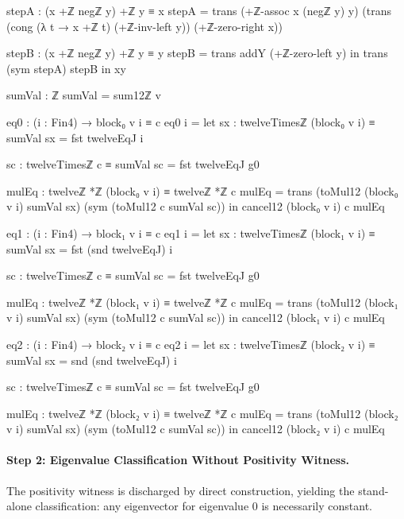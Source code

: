 \documentclass[11pt,a4paper]{book}
\begin{document}
\begin{code}
            stepA : (x +ℤ negℤ y) +ℤ y ≡ x
            stepA =
              trans
                (+ℤ-assoc x (negℤ y) y)
                (trans
                  (cong (λ t → x +ℤ t) (+ℤ-inv-left y))
                  (+ℤ-zero-right x))

            stepB : (x +ℤ negℤ y) +ℤ y ≡ y
            stepB = trans addY (+ℤ-zero-left y)
          in
          trans (sym stepA) stepB
      in
      xy

    sumVal : ℤ
    sumVal = sum12ℤ v

    eq0 : (i : Fin4) → block₀ v i ≡ c
    eq0 i =
      let
        sx : twelveTimesℤ (block₀ v i) ≡ sumVal
        sx = fst twelveEqJ i

        sc : twelveTimesℤ c ≡ sumVal
        sc = fst twelveEqJ g0

        mulEq : twelveℤ *ℤ (block₀ v i) ≡ twelveℤ *ℤ c
        mulEq = trans (toMul12 (block₀ v i) sumVal sx) (sym (toMul12 c sumVal sc))
      in
      cancel12 (block₀ v i) c mulEq

    eq1 : (i : Fin4) → block₁ v i ≡ c
    eq1 i =
      let
        sx : twelveTimesℤ (block₁ v i) ≡ sumVal
        sx = fst (snd twelveEqJ) i

        sc : twelveTimesℤ c ≡ sumVal
        sc = fst twelveEqJ g0

        mulEq : twelveℤ *ℤ (block₁ v i) ≡ twelveℤ *ℤ c
        mulEq = trans (toMul12 (block₁ v i) sumVal sx) (sym (toMul12 c sumVal sc))
      in
      cancel12 (block₁ v i) c mulEq

    eq2 : (i : Fin4) → block₂ v i ≡ c
    eq2 i =
      let
        sx : twelveTimesℤ (block₂ v i) ≡ sumVal
        sx = snd (snd twelveEqJ) i

        sc : twelveTimesℤ c ≡ sumVal
        sc = fst twelveEqJ g0

        mulEq : twelveℤ *ℤ (block₂ v i) ≡ twelveℤ *ℤ c
        mulEq = trans (toMul12 (block₂ v i) sumVal sx) (sym (toMul12 c sumVal sc))
      in
      cancel12 (block₂ v i) c mulEq
\end{code}

\paragraph{Step 2: Eigenvalue Classification Without Positivity Witness.}
The positivity witness is discharged by direct construction,
yielding the stand-alone classification: any eigenvector
for eigenvalue 0 is necessarily constant.
\end{document}
